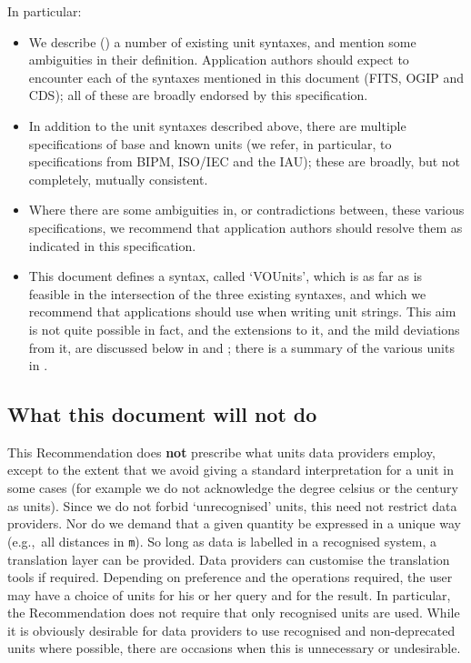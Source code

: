 \documentclass[11pt,a4paper]{ivoa}
\newcommand{\unit}[1]{\texttt{\small\color{orange}#1}}
\def\eg{e.g.,~}
\begin{document}
In particular:
\begin{itemize}
\item We describe () a number of existing unit
  syntaxes, and mention some ambiguities in their
  definition. Application authors should expect to encounter each of
  the syntaxes mentioned in this document (FITS, OGIP and CDS); all of
  these are broadly endorsed by this specification.
\item In addition to the unit syntaxes described above, there are
  multiple specifications of base and known units
  (we refer, in particular, to 
  specifications from BIPM, ISO/IEC and the IAU);
  these are broadly, but not completely, mutually consistent.
\item Where there are some ambiguities in, or contradictions between,
  these various specifications, we recommend that application authors should
  resolve them as indicated in this specification.  
\item This document defines a syntax, called `VOUnits', which is as
  far as is feasible in the intersection of the three existing
  syntaxes, and which we recommend that applications should use when
  writing unit strings.  This aim is not quite possible in fact, and
  the extensions to it, and the mild deviations from it, are discussed
  below in  and ;
  there is a summary of the various units
  in .
\end{itemize}




\subsection{What this document will not do}
\label{sec:outofscope}

This Recommendation does \textbf{not} prescribe what units data
providers employ, except to the extent that we avoid giving a standard
interpretation for a unit in some cases (for example we do not
acknowledge the degree celsius or the century as units).  Since we do
not forbid `unrecognised' units, this need not restrict data providers.
Nor do we demand that a given quantity be expressed in a
unique way (\eg all distances in \unit{m}).  So long as data is
labelled in a recognised system, a translation layer can be
provided. Data providers can customise the translation tools if
required. Depending on preference and the operations required, the
user may have a choice of units for his or her query and for the
result.  In particular, the Recommendation does not require that only
recognised units are used.  While it is obviously desirable for data
providers to use recognised and non-deprecated units where possible,
there are occasions when this is unnecessary or undesirable.
\end{document}
